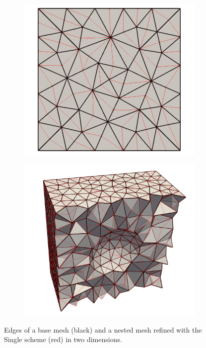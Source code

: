 \begin{figure}[ht!]
\centering
\begin{subfigure}{.5\textwidth}
\centering
\includegraphics[width=.9\linewidth]{img/refine_single_mesh.png}
\end{subfigure}%
\begin{subfigure}{.5\textwidth}
\centering
\includegraphics[width=.99\linewidth]{img/refine_single_mesh_3D.png}
\end{subfigure}
\caption{Edges of a base mesh (black) and a nested mesh refined
with the Single scheme (red) in two dimensions.}
\label{fig:single_mesh}
\end{figure}

